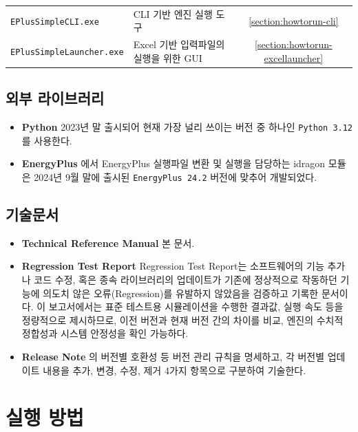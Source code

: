 \begin{defaulttable}
\begin{tabularx}{\textwidth}{l X c}
    \texttt{EPlusSimpleCLI.exe} & CLI 기반 엔진 실행 도구 & \ref{section:howtorun-cli} \\
    \texttt{EPlusSimpleLauncher.exe} & Excel 기반 입력파일의 실행을 위한 GUI & \ref{section:howtorun-excellauncher} \\
    
    \bottomrule
  \end{tabularx}
\end{defaulttable}

\section{외부 라이브러리}
\label{section:dirstructure-devenv}

\begin{itemize}
  \item \textbf{Python} \simulator \는 2023년 말 출시되어 현재 가장 널리 쓰이는 버전 중 하나인 \texttt{Python 3.12}\cite{python312}를 사용한다.
  \item \textbf{EnergyPlus} \simulator 에서 EnergyPlus 실행파일 변환 및 실행을 담당하는 idragon 모듈은 2024년 9월 말에 출시된 \texttt{EnergyPlus 24.2}\cite{energyplus242} 버전에 맞추어 개발되었다.
\end{itemize}


\section{기술문서}
\label{section:dirstructure-documentation}

\begin{itemize}
  \item \textbf{Technical Reference Manual} 본 문서.
  \item \textbf{Regression Test Report} Regression Test Report는 소프트웨어의 기능 추가나 코드 수정, 혹은 종속 라이브러리의 업데이트가 기존에 정상적으로 작동하던 기능에 의도치 않은 오류(Regression)를 유발하지 않았음을 검증하고 기록한 문서이다\cite{sommerville2015software}. 이 보고서에서는 표준 테스트용 시뮬레이션을 수행한 결과값, 실행 속도 등을 정량적으로 제시하므로, 이전 버전과 현재 버전 간의 차이를 비교, 엔진의 수치적 정합성과 시스템 안정성을 확인 가능하다.
  \item \textbf{Release Note} \simulator 의 버전별 호환성 등 버전 관리 규칙을 명세하고, 각 버전별 업데이트 내용을 추가, 변경, 수정, 제거 4가지 항목으로 구분하여 기술한다.
\end{itemize}


\chapter{실행 방법}

